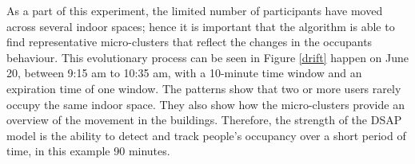 
As a part of this experiment, the limited number of participants have moved across several indoor spaces; hence it is important that the algorithm is able to find representative micro-clusters that reflect the changes in the occupants behaviour. This evolutionary process can be seen in Figure \ref{drift} happen on June 20, between 9:15 am to 10:35 am, with a 10-minute time window and an expiration time of one window. The patterns show that two or more users rarely occupy the same indoor space. They also show how the micro-clusters provide an overview of the movement in the buildings. Therefore, the strength of the DSAP model is the ability to detect and track people's occupancy over a short period of time, in this example 90 minutes.



